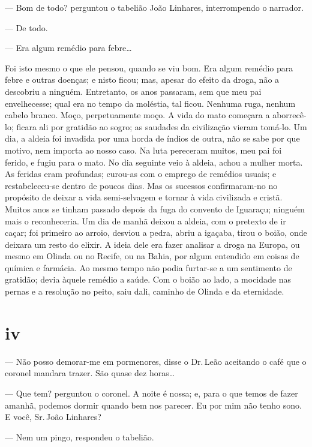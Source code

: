 --- Bom de todo? perguntou o tabelião João Linhares, interrompendo o
narrador.

--- De todo.

--- Era algum remédio para febre\ldots{}

Foi isto mesmo o que ele pensou, quando se viu bom. Era algum remédio
para febre e outras doenças; e nisto ficou; mas, apesar do efeito da
droga, não a descobriu a ninguém. Entretanto, os anos passaram, sem que
meu pai envelhecesse; qual era no tempo da moléstia, tal ficou. Nenhuma
ruga, nenhum cabelo branco. Moço, perpetuamente moço. A vida do mato
começara a aborrecê-lo; ficara ali por gratidão ao sogro; as saudades da
civilização vieram tomá-lo. Um dia, a aldeia foi invadida por uma horda
de índios de outra, não se sabe por que motivo, nem importa ao nosso
caso. Na luta pereceram muitos, meu pai foi ferido, e fugiu para o mato.
No dia seguinte veio à aldeia, achou a mulher morta. As feridas eram
profundas; curou-as com o emprego de remédios usuais; e restabeleceu-se
dentro de poucos dias. Mas os sucessos confirmaram-no no propósito de
deixar a vida semi-selvagem e tornar à vida civilizada e cristã. Muitos
anos se tinham passado depois da fuga do convento de Iguaraçu; ninguém
mais o reconheceria. Um dia de manhã deixou a aldeia, com o pretexto de
ir caçar; foi primeiro ao arroio, desviou a pedra, abriu a igaçaba,
tirou o boião, onde deixara um resto do elixir. A ideia dele era fazer
analisar a droga na Europa, ou mesmo em Olinda ou no Recife, ou na
Bahia, por algum entendido em coisas de química e farmácia. Ao mesmo
tempo não podia furtar-se a um sentimento de gratidão; devia àquele
remédio a saúde. Com o boião ao lado, a mocidade nas pernas e a
resolução no peito, saiu dali, caminho de Olinda e da eternidade.





\section{iv}



--- Não posso demorar-me em pormenores, disse o Dr.\,Leão aceitando o
café que o coronel mandara trazer. São quase dez horas\ldots{}

--- Que tem? perguntou o coronel. A noite é nossa; e, para o que temos
de fazer amanhã, podemos dormir quando bem nos parecer. Eu por mim não
tenho sono. E você, Sr.\,João Linhares?

--- Nem um pingo, respondeu o tabelião.

